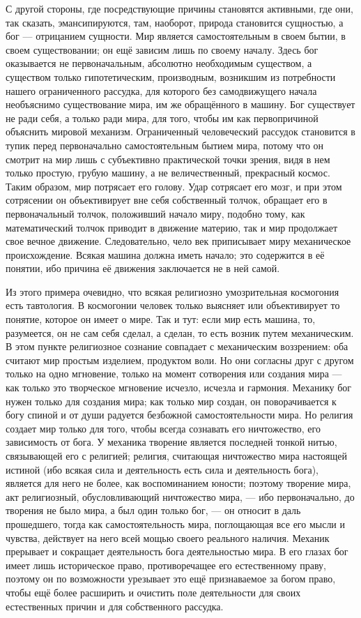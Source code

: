 \documentclass[12pt,oneside]{book}
\begin{document}
С другой стороны, где посредствующие причины становятся активными, где они, так сказать, эмансипируются, там, наоборот, природа становится сущностью, а бог --- отрицанием сущности. Мир является самостоятельным в своем бытии, в своем существовании; он ещё зависим лишь по своему началу. Здесь бог оказывается не первоначальным, абсолютно необходимым существом, а существом только гипотетическим, производным, возникшим из потребности нашего ограниченного рассудка, для которого без самодвижущего начала необъяснимо существование мира, им же обращённого в машину. Бог существует не ради себя, а только ради мира, для того, чтобы им как первопричиной объяснить мировой механизм. Ограниченный человеческий рассудок становится в тупик перед первоначально самостоятельным бытием мира, потому что он смотрит на мир лишь с субъективно практической точки зрения, видя в нем только простую, грубую машину, а не величественный, прекрасный космос. Таким образом, мир потрясает его голову. Удар сотрясает его мозг, и при этом сотрясении он объективирует вне себя собственный толчок, обращает его в первоначальный толчок, положивший начало миру, подобно тому, как математический толчок приводит в движение материю, так и мир продолжает свое вечное движение. Следовательно, чело век приписывает миру механическое происхождение. Всякая машина должна иметь начало; это содержится в её понятии, ибо причина её движения заключается не в ней самой.

Из этого примера очевидно, что всякая религиозно умозрительная космогония есть тавтология. В космогонии человек только выясняет или объективирует то понятие, которое он имеет о мире. Так и тут: если мир есть машина, то, разумеется, он не сам себя сделал, а сделан, то есть возник путем механическим. В этом пункте религиозное сознание совпадает с механическим воззрением: оба считают мир простым изделием, продуктом воли. Но они согласны друг с другом только на одно мгновение, только на момент сотворения или создания мира --- как только это творческое мгновение исчезло, исчезла и гармония. Механику бог нужен только для создания мира; как только мир создан, он поворачивается к богу спиной и от души радуется безбожной самостоятельности мира. Но религия создает мир только для того, чтобы всегда сознавать его ничтожество, его зависимость от бога. У механика творение является последней тонкой нитью, связывающей его с религией; религия, считающая ничтожество мира настоящей истиной (ибо всякая сила и деятельность есть сила и деятельность бога), является для него не более, как воспоминанием юности; поэтому творение мира, акт религиозный, обусловливающий ничтожество мира, --- ибо первоначально, до творения не было мира, а был один только бог, --- он относит в даль прошедшего, тогда как самостоятельность мира, поглощающая все его мысли и чувства, действует на него всей мощью своего реального наличия. Механик прерывает и сокращает деятельность бога деятельностью мира. В его глазах бог имеет лишь историческое право, противоречащее его естественному праву, поэтому он по возможности урезывает это ещё признаваемое за богом право, чтобы ещё более расширить и очистить поле деятельности для своих естественных причин и для собственного рассудка.
\end{document}
